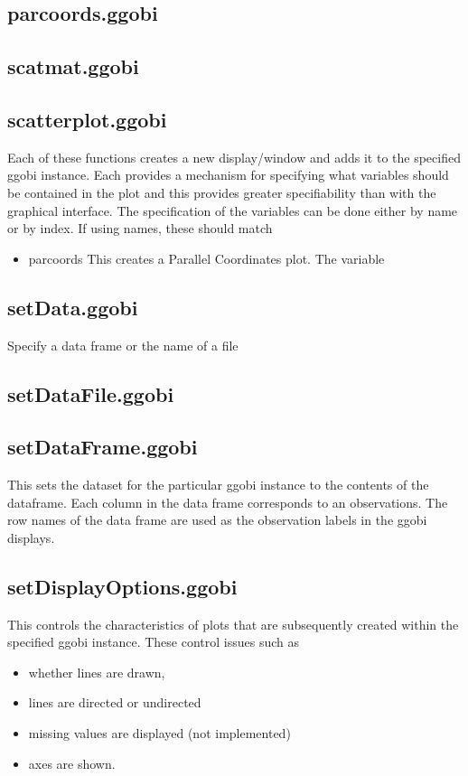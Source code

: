 \documentclass{article}
\begin{document}
\subsection{parcoords.ggobi}
\subsection{scatmat.ggobi}
\subsection{scatterplot.ggobi}
Each of these functions creates a new display/window and adds it to
the specified ggobi instance.  Each provides a mechanism for
specifying what variables should be contained in the plot and this
provides greater specifiability than with the graphical interface.
The specification of the variables can be done either by 
name or by index.
If using names, these should match
\begin{itemize}
\item{parcoords}
This creates a Parallel Coordinates plot.
The variable
\end{itemize}




\subsection{setData.ggobi}
Specify a data frame or the name of a file

\subsection{setDataFile.ggobi}
\subsection{setDataFrame.ggobi}
This sets the dataset for the particular ggobi instance to the
contents of the dataframe.  Each column in the data frame corresponds
to an observations. The row names of the data frame are used as the
observation labels in the ggobi displays.

\subsection{setDisplayOptions.ggobi}
This controls the characteristics
of plots that are subsequently
created within the specified ggobi instance.
These control issues such as 
\begin{itemize}
\item whether lines are drawn, 
\item lines are directed or undirected
\item missing values are displayed (not implemented)  
\item axes are shown.
\end{itemize}
\end{document}
